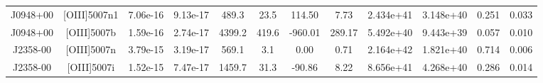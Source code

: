 \begin{table}
\begin{tabular}{cccccccccccc}
J0948+00 & [OIII]5007n1 & 7.06e-16 & 9.13e-17 & 489.3 & 23.5 & 114.50 & 7.73 & 2.434e+41 & 3.148e+40 & 0.251 & 0.033 \\
J0948+00 & [OIII]5007b & 1.59e-16 & 2.74e-17 & 4399.2 & 419.6 & -960.01 & 289.17 & 5.492e+40 & 9.443e+39 & 0.057 & 0.010 \\
J2358-00 & [OIII]5007n & 3.79e-15 & 3.19e-17 & 569.1 & 3.1 & 0.00 & 0.71 & 2.164e+42 & 1.821e+40 & 0.714 & 0.006 \\
J2358-00 & [OIII]5007i & 1.52e-15 & 7.47e-17 & 1459.7 & 31.3 & -90.86 & 8.22 & 8.656e+41 & 4.268e+40 & 0.286 & 0.014 \\
\end{tabular}
\end{table}
